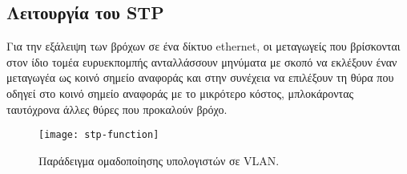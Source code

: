 \documentclass[eforms]{EdipyLabs} %
\begin{document}
\subsection{Λειτουργία του STP}

Για την εξάλειψη των βρόχων σε ένα δίκτυο ethernet, οι μεταγωγείς που βρίσκονται στον ίδιο τομέα ευρυεκπομπής ανταλλάσσουν μηνύματα με σκοπό να εκλέξουν έναν μεταγωγέα ως κοινό σημείο αναφοράς και στην συνέχεια να επιλέξουν τη θύρα που οδηγεί στο κοινό σημείο αναφοράς με το μικρότερο κόστος, μπλοκάροντας ταυτόχρονα άλλες θύρες που προκαλούν βρόχο.


\begin{figure}[ht]
	\centering
	\texttt{[image: stp-function]}
	\caption{Παράδειγμα ομαδοποίησης υπολογιστών σε VLAN.}\label{fig:stp}
\end{figure}
\end{document}
